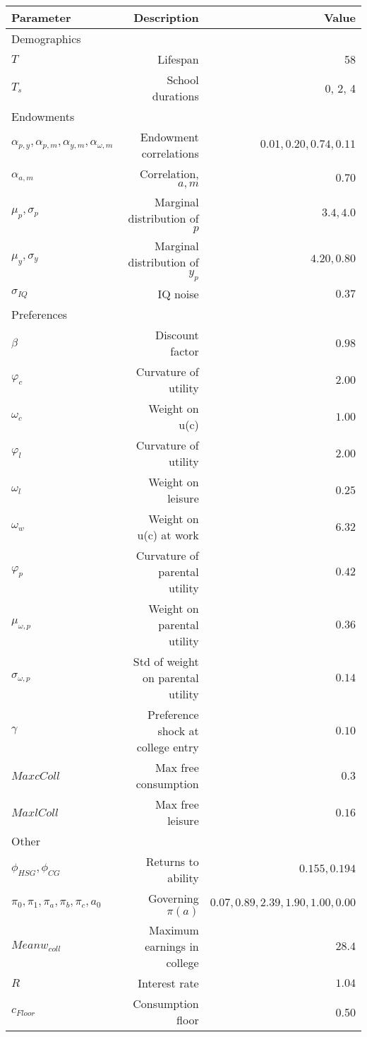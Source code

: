 \begin{tabular}{lrr}
\hline
Parameter & Description  & Value  \\
\hline
Demographics &   &   \\
$T$ & Lifespan  & 58  \\
$T_{s}$ & School durations  & 0, 2, 4  \\
Endowments &   &   \\
$\alpha_{p,y}, \alpha_{p,m}, \alpha_{y,m}, \alpha_{\omega,m}$ & Endowment correlations  & $0.01, 0.20, 0.74, 0.11$  \\
$\alpha_{a,m}$ & Correlation, $a,m$  & $0.70$  \\
$\mu_{p}, \sigma_{p}$ & Marginal distribution of $p$  & $3.4, 4.0$  \\
$\mu_{y}, \sigma_{y}$ & Marginal distribution of $y_{p}$  & $4.20, 0.80$  \\
$\sigma_{IQ}$ & IQ noise  & $0.37$  \\
Preferences &   &   \\
$\beta$ & Discount factor  & $0.98$  \\
$\varphi_{c}$ & Curvature of utility  & $2.00$  \\
$\omega_{c}$ & Weight on u(c)  & $1.00$  \\
$\varphi_{l}$ & Curvature of utility  & $2.00$  \\
$\omega_{l}$ & Weight on leisure  & $0.25$  \\
$\omega_{w}$ & Weight on u(c) at work  & $6.32$  \\
$\varphi_{p}$ & Curvature of parental utility  & $0.42$  \\
$\mu_{\omega,p}$ & Weight on parental utility  & $0.36$  \\
$\sigma_{\omega,p}$ & Std of weight on parental utility  & $0.14$  \\
$\gamma$ & Preference shock at college entry  & $0.10$  \\
$Max cColl$ & Max free consumption  & $0.3$  \\
$Max lColl$ & Max free leisure  & $0.16$  \\
Other &   &   \\
$\phi_{HSG}, \phi_{CG}$ & Returns to ability  & $0.155, 0.194$  \\
$\pi_{0}, \pi_{1}, \pi_{a}, \pi_{b}, \pi_{c}, a_{0}$ & Governing $\pi(a)$  & $0.07, 0.89, 2.39, 1.90, 1.00, 0.00$  \\
$Mean w_{coll}$ & Maximum earnings in college  & $28.4$  \\
$R$ & Interest rate  & $1.04$  \\
$c_{Floor}$ & Consumption floor  & 0.50  \\
\hline
\end{tabular}%
